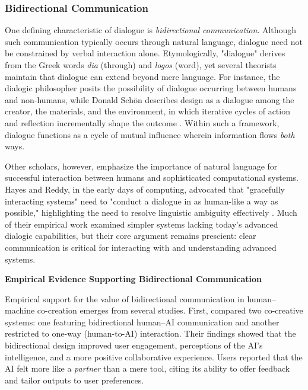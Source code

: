 \subsubsection{Bidirectional Communication}

One defining characteristic of dialogue is \textit{bidirectional communication}. Although such communication typically occurs through natural language, dialogue need not be constrained by verbal interaction alone. Etymologically, "dialogue" derives from the Greek words \textit{dia} (through) and \textit{logos} (word), yet several theorists maintain that dialogue can extend beyond mere language. For instance, the dialogic philosopher \cite{Buber1923-us} posits the possibility of dialogue occurring between humans and non-humans, while Donald Schön describes design as a dialogue among the creator, the materials, and the environment, in which iterative cycles of action and reflection incrementally shape the outcome \cite{Schon1987-fy,Schon1992-jt}. Within such a framework, dialogue functions as a cycle of mutual influence wherein information flows \textit{both} ways.

Other scholars, however, emphasize the importance of natural language for successful interaction between humans and sophisticated computational systems. Hayes and Reddy, in the early days of computing, advocated that "gracefully interacting systems" need to "conduct a dialogue in as human-like a way as possible," highlighting the need to resolve linguistic ambiguity effectively \cite{Hayes1983-ca}. Much of their empirical work examined simpler systems lacking today's advanced dialogic capabilities, but their core argument remains prescient: clear communication is critical for interacting with and understanding advanced systems.

\textbf{Empirical Evidence Supporting Bidirectional Communication}

Empirical support for the value of bidirectional communication in human–machine co-creation emerges from several studies. First, \cite{Rezwana2022-gg} compared two co-creative systems: one featuring bidirectional human–AI communication and another restricted to one-way (human-to-AI) interaction. Their findings showed that the bidirectional design improved user engagement, perceptions of the AI's intelligence, and a more positive collaborative experience. Users reported that the AI felt more like a \textit{partner} than a mere tool, citing its ability to offer feedback and tailor outputs to user preferences. 

